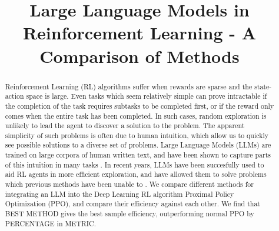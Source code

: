 \documentclass[conference]{IEEEtran}
\begin{document}
\title{Large Language Models in Reinforcement Learning - A Comparison of Methods}

\author{
\and
{}
\and
{}
}

\maketitle

\begin{abstract}

Reinforcement Learning (RL) algorithms suffer when rewards are sparse and the state-action space is large. Even tasks which seem relatively simple can prove intractable if the completion of the task requires subtasks to be completed first, or if the reward only comes when the entire task has been completed. In such cases, random exploration is unlikely to lead the agent to discover a solution to the problem. The apparent simplicity of such problems is often due to human intuition, which allow us to quickly see possible solutions to a diverse set of problems. Large Language Models (LLMs) are trained on large corpora of human written text, and have been shown to capture parts of this intuition in many tasks \cite{sparks}. In recent years, LLMs have been succesfully used to aid RL agents in more efficient exploration, and have allowed them to solve problems which previous methods have been unable to \cite{omni} \cite{ellm}. We compare different methods for integrating an LLM into the Deep Learning RL algorithm Proximal Policy Optimization (PPO), and compare their efficiency against each other. We find that BEST METHOD gives the best sample efficiency, outperforming normal PPO by PERCENTAGE in METRIC.

\end{abstract}
\end{document}
